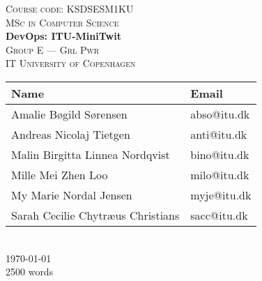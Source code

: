 \newcommand{\HRule}{\rule{1.25\linewidth}{0.5mm}}
\center
\vspace*{-4.35cm}
%
\vspace{3cm}
\textsc{\large Course code: KSDSESM1KU}
\\[0.2cm]
\textsc{\large MSc in Computer Science}
\\[0.5cm]
\hbox{\makebox[1\textwidth][c]{\HRule}}
\vspace{0.4cm}
{ \huge \bfseries DevOps: ITU-MiniTwit}
\\[0.6cm]
\hbox{\makebox[1\textwidth][c]{\HRule}}
\vspace{0.9cm}
\textsc{\Large Group E --- Grl Pwr\\[0.5cm]IT University of Copenhagen}\\[1.5cm]
\begin{tabular}{ll}
\toprule
\textbf{Name} & \textbf{Email} \\
\midrule
Amalie Bøgild Sørensen & abso@itu.dk \\
Andreas Nicolaj Tietgen & anti@itu.dk \\
Malin Birgitta Linnea Nordqvist & bino@itu.dk \\
Mille Mei Zhen Loo & milo@itu.dk \\
My Marie Nordal Jensen & myje@itu.dk \\
Sarah Cecilie Chytræus Christians & sacc@itu.dk \\

\bottomrule
\end{tabular}
\\[2cm]
{\large \today}
\\[1.5cm]
{\large 2500 words}
\vfill
